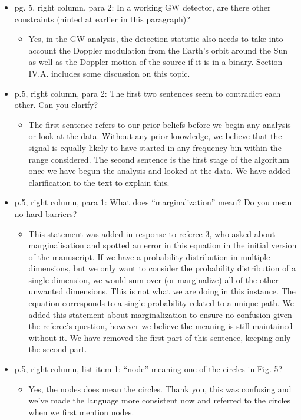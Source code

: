 \documentclass[a4paper, 10pt]{letter}
\begin{document}
\begin{itemize}
\item pg. 5, right column, para 2: In a working GW detector, are there other constraints (hinted at earlier in this paragraph)?
\begin{itemize}
\item Yes, in the GW analysis, the detection statistic also needs to take into account the Doppler modulation from the Earth's orbit around the Sun as well as the Doppler motion of the source if it is in a binary. Section IV.A. includes some discussion on this topic. 
\end{itemize}


\item p.5, right column, para 2: The first two sentences seem to contradict each other. Can you clarify? 
\begin{itemize}
\item The first sentence refers to our prior beliefs before we begin any analysis or look at the data. Without any prior knowledge, we believe that the signal is equally likely to have started in any frequency bin within the range considered. The second sentence is the first stage of the algorithm once we have begun the analysis and looked at the data. We have added clarification to the text to explain this. 
\end{itemize}

\item p.5, right column, para 1: What does ``marginalization'' mean? Do you mean no hard barriers?
\begin{itemize}
\item This statement was added in response to referee 3, who asked about marginalisation and spotted an error in this equation in the initial version of the manuscript. If we have a probability distribution in multiple dimensions, but we only want to consider the probability distribution of a single dimension, we would sum over (or marginalize) all of the other unwanted dimensions. This is not what we are doing in this instance. The equation corresponds to a single probability related to a unique path. We added this statement about marginalization to ensure no confusion given the referee's question, however we believe the meaning is still maintained without it. We have removed the first part of this sentence, keeping only the second part. 
\end{itemize}

\item p.5, right column, list item 1: ``node'' meaning one of the circles in Fig. 5? 
\begin{itemize}
\item Yes, the nodes does mean the circles. Thank you, this was confusing and we've made the language more consistent now and referred to the circles when we first mention nodes.
\end{itemize}


\end{itemize}
\end{document}
